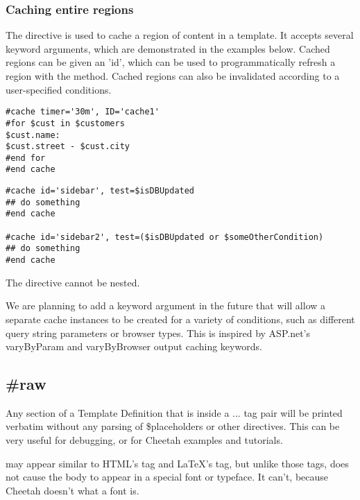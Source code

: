 \subsubsection{Caching entire regions}
\label{output.caching.regions}

The  directive is used to cache a region of content in a template.
It accepts several keyword arguments, which are demonstrated in the examples
below.  Cached regions can be given an 'id', which can be used to
programmatically refresh a region with the 
method.  Cached regions can also be invalidated according to a user-specified
 conditions.

\begin{verbatim}
#cache timer='30m', ID='cache1'
#for $cust in $customers
$cust.name:
$cust.street - $cust.city
#end for
#end cache
\end{verbatim}

\begin{verbatim}
#cache id='sidebar', test=$isDBUpdated
## do something
#end cache

#cache id='sidebar2', test=($isDBUpdated or $someOtherCondition)
## do something
#end cache
\end{verbatim}

The  directive cannot be nested.

We are planning to add a  keyword argument in the future that
will allow a separate cache instances to be created for a variety of conditions,
such as different query string parameters or browser types. This is inspired by
ASP.net's varyByParam and varyByBrowser output caching keywords.


\subsection{\#raw}
\label{output.raw}

Any section of a Template Definition that is inside a  ...
 tag pair will be printed verbatim without any parsing of
\$placeholders or other directives. This can be very useful for debugging, or
for Cheetah examples and tutorials.

 may appear similar to HTML's  tag and LaTeX's
\code{\\verbatim\{\}} tag, but unlike those tags,  does not cause
the body to appear in a special font or typeface.  It can't, because Cheetah
doesn't what a font is.  


